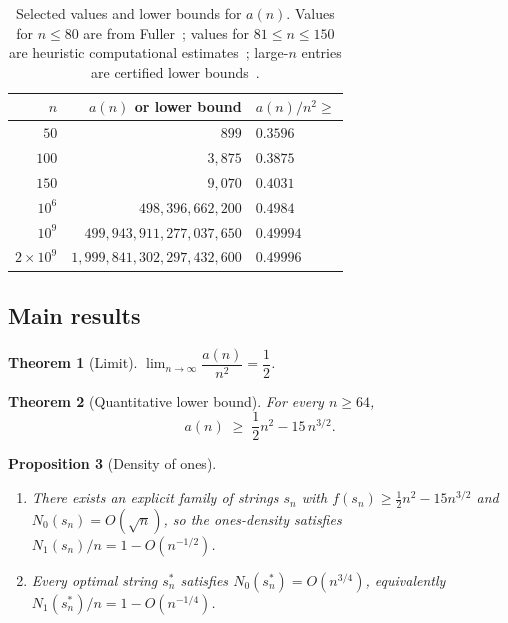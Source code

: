 ﻿\documentclass[11pt,a4paper]{article}
\theoremstyle{plain}
\newtheorem{theorem}{Theorem}
\newtheorem{proposition}[theorem]{Proposition}
\theoremstyle{definition}
\theoremstyle{remark}
\newcommand{\ones}{N_1}
\newcommand{\zeros}{N_0}
\begin{document}
\begin{table}[ht]
\centering
\begin{tabular}{rrl}
\toprule
$n$ & $a(n)$ or lower bound & $a(n)/n^2\ge$ \\
\midrule
$50$            & $899$                                    & $0.3596$ \\
$100$           & $3{,}875$                                & $0.3875$ \\
$150$           & $9{,}070$                                & $0.4031$ \\
$10^6$          & $498{,}396{,}662{,}200$                  & $0.4984$ \\
$10^9$          & $499{,}943{,}911{,}277{,}037{,}650$      & $0.49994$ \\
$2\times10^9$   & $1{,}999{,}841{,}302{,}297{,}432{,}600$ & $0.49996$ \\
\bottomrule
\end{tabular}
\caption{Selected values and lower bounds for $a(n)$.
  Values for $n\le80$ are from Fuller~\cite{oeis};
  values for $81\le n\le150$ are heuristic computational estimates~\cite{github};
  large-$n$ entries are certified lower bounds~\cite{github}.}
\label{tab:evidence}
\end{table}

\subsection{Main results}

\begin{theorem}[Limit]\label{thm:limit}
$\displaystyle\lim_{n\to\infty}\dfrac{a(n)}{n^2}=\dfrac{1}{2}$.
\end{theorem}

\begin{theorem}[Quantitative lower bound]\label{thm:quant}
For every $n\ge64$,
\[
  a(n)\;\ge\;\frac{1}{2}n^2-15\,n^{3/2}.
\]
\end{theorem}

\begin{proposition}[Density of ones]\label{prop:density}
\leavevmode
\begin{enumerate}[label=\normalfont(\roman*)]
\item There exists an explicit family of strings $s_n$ with
  $f(s_n)\ge\tfrac{1}{2}n^2-15n^{3/2}$ and $\zeros(s_n)=O(\sqrt{n})$,
  so the ones-density satisfies $\ones(s_n)/n=1-O(n^{-1/2})$.
\item Every optimal string $s_n^*$ satisfies $\zeros(s_n^*)=O(n^{3/4})$,
  equivalently $\ones(s_n^*)/n=1-O(n^{-1/4})$.
\end{enumerate}
\end{proposition}
\end{document}
